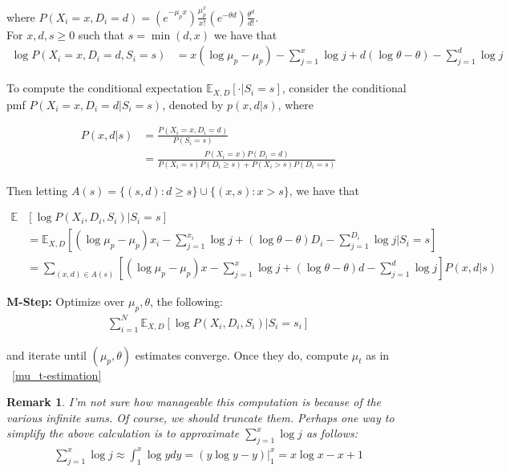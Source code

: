 \documentclass[11pt, oneside]{article}   	%
\theoremstyle{ModifiedStyle}
\newtheorem{remark}{Remark}
\begin{document}
			\noindent where $P(X_i=x,D_i=d) = (e^{-\mu_px})\frac{\mu_p^x}{x!} (e^{-\theta d}) \frac{\theta^d}{d!}$.\\
			For $x,d,s \geq 0$ such that $s=\min(d,x)$ we have that
			\begin{align*}
				\log P(X_i=x,D_i=d,S_i=s) &= x(\log \mu_p - \mu_p) - \sum_{j=1}^x \log j + d(\log\theta - \theta) - \sum_{j=1}^d \log j
			\end{align*}

			To compute the conditional expectation $\mathbb{E}_{X,D}[\cdot | S_i =s]$, consider
			the conditional pmf $P(X_i=x,D_i=d | S_i = s)$, denoted by $p(x,d|s)$, where

			\begin{align*}
				P(x,d|s) &= \frac{P(X_i = x, D_i = d)}{P(S_i = s)} \\
				&= \frac{P(X_i = x) P(D_i = d)}{P(X_i = s) P(D_i \geq s) + P(X_i > s) P(D_i = s)}
			\end{align*}

			Then letting $A(s) = \{(s,d) : d \geq s \} \cup \{(x,s):x>s\}$, we have that

			\begin{align*}
				\mathbb{E}&[\log P(X_i,D_i,S_i) | S_i =s] \\
				 &= \mathbb{E}_{X,D}[(\log \mu_p -\mu_p)x_i - \sum_{j=1}^{x_i} \log j + (\log \theta - \theta)D_i - \sum_{j=1}^{D_i} \log j | S_i = s]\\
				 &= \sum_{(x,d)\in A(s)} [(\log \mu_p - \mu_p)x - \sum_{j=1}^x \log j + (\log \theta - \theta)d - \sum_{j=1}^d \log j]P(x,d|s)
			\end{align*}

			\noindent \textbf{M-Step:} Optimize over $\mu_p, \theta$, the following:
			\begin{align*}
				\sum_{i=1}^N \mathbb{E}_{X,D}[\log P(X_i,D_i,S_i)|S_i = s_i]
			\end{align*}

			\noindent and iterate until $(\mu_p,\theta)$ estimates converge. Once they do, compute $\mu_t$ as in ~\ref{mu_t-estimation}

			\begin{remark}
				I'm not sure how manageable this computation is because of the various infinite sums. Of course, we should truncate them. Perhaps one way to simplify the above calculation is to approximate $\sum_{j=1}^x\log j$ as follows:
				\begin{align*}
					\sum_{j=1}^x \log j \approx \int_1^x \log y dy = (y\log y - y) |_1^x = x\log x - x + 1
				\end{align*}
			\end{remark}
\end{document}
